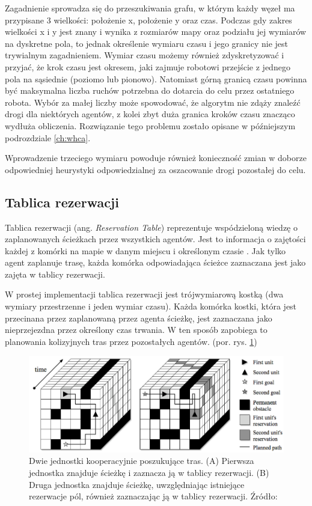 Zagadnienie sprowadza się do przeszukiwania grafu, w którym każdy węzeł ma przypisane 3 wielkości: położenie x, położenie y oraz czas.
Podczas gdy zakres wielkości x i y jest znany i wynika z rozmiarów mapy oraz podziału jej wymiarów na dyskretne pola, to jednak określenie wymiaru czasu i jego granicy nie jest trywialnym zagadnieniem.
Wymiar czasu możemy również zdyskretyzować i przyjać, że krok czasu jest okresem, jaki zajmuje robotowi przejście z jednego pola na sąsiednie (poziomo lub pionowo). Natomiast górną granicą czasu powinna być maksymalna liczba ruchów potrzebna do dotarcia do celu przez ostatniego robota. Wybór za małej liczby może spowodować, że algorytm nie zdąży znaleźć drogi dla niektórych agentów, z kolei zbyt duża granica kroków czasu znacząco wydłuża obliczenia. Rozwiązanie tego problemu zostało opisane w późniejszym podrozdziale \ref{ch:whca}.

Wprowadzenie trzeciego wymiaru powoduje również konieczność zmian w doborze odpowiedniej heurystyki odpowiedzialnej za oszacowanie drogi pozostałej do celu.

\subsection{Tablica rezerwacji}
Tablica rezerwacji (ang. {\it Reservation Table}) reprezentuje wspódzieloną wiedzę o zaplanowanych ścieżkach przez wszystkich agentów.
Jest to informacja o zajętości każdej z komórki na mapie w danym miejscu i określonym czasie \cite{cooppath}.
Jak tylko agent zaplanuje trasę, każda komórka odpowiadająca ścieżce zaznaczana jest jako zajęta w tablicy rezerwacji.

W prostej implementacji tablica rezerwacji jest trójwymiarową kostką (dwa wymiary przestrzenne i jeden wymiar czasu).
Każda komórka kostki, która jest przecinana przez zaplanowaną przez agenta ścieżkę, jest zaznaczana jako nieprzejezdna przez określony czas trwania. W ten sposób zapobiega to planowania kolizyjnych tras przez pozostałych agentów. (por. rys. \ref{fig:img_reservation-table})

\begin{figure}
	\centering
	\includegraphics[width=13cm]{img/reservation-table}
	\caption{Dwie jednostki kooperacyjnie poszukujące tras. (A) Pierwsza jednostka znajduje ścieżkę i zaznacza ją w tablicy rezerwacji. (B) Druga jednostka znajduje ścieżkę, uwzględniając istniejące rezerwacje pól, również zaznaczając ją w tablicy rezerwacji. Źródło: \cite{cooppath}}
	\label{fig:img_reservation-table}
\end{figure}

